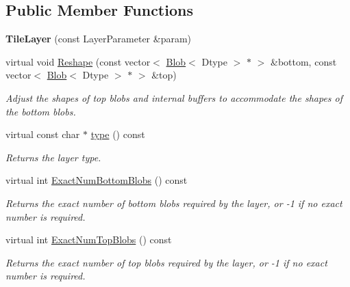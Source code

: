 \subsection*{Public Member Functions}
\begin{DoxyCompactItemize}
\item 
{\bfseries Tile\+Layer} (const Layer\+Parameter \&param)\hypertarget{classcaffe_1_1TileLayer_a7c6cb911e56abaf3dc43c38b8dc0e94e}{}\label{classcaffe_1_1TileLayer_a7c6cb911e56abaf3dc43c38b8dc0e94e}

\item 
virtual void \hyperlink{classcaffe_1_1TileLayer_acac859e9a1ed4a168bdece50543a6d2c}{Reshape} (const vector$<$ \hyperlink{classcaffe_1_1Blob}{Blob}$<$ Dtype $>$ $\ast$ $>$ \&bottom, const vector$<$ \hyperlink{classcaffe_1_1Blob}{Blob}$<$ Dtype $>$ $\ast$ $>$ \&top)
\begin{DoxyCompactList}\small\item\em Adjust the shapes of top blobs and internal buffers to accommodate the shapes of the bottom blobs. \end{DoxyCompactList}\item 
virtual const char $\ast$ \hyperlink{classcaffe_1_1TileLayer_a20aaa38201d0fe2d61fdd79b73c10d58}{type} () const \hypertarget{classcaffe_1_1TileLayer_a20aaa38201d0fe2d61fdd79b73c10d58}{}\label{classcaffe_1_1TileLayer_a20aaa38201d0fe2d61fdd79b73c10d58}

\begin{DoxyCompactList}\small\item\em Returns the layer type. \end{DoxyCompactList}\item 
virtual int \hyperlink{classcaffe_1_1TileLayer_a7135c09877493a4ac9533f3952af74ae}{Exact\+Num\+Bottom\+Blobs} () const 
\begin{DoxyCompactList}\small\item\em Returns the exact number of bottom blobs required by the layer, or -\/1 if no exact number is required. \end{DoxyCompactList}\item 
virtual int \hyperlink{classcaffe_1_1TileLayer_a4f442a78d1234169a1ef3d51f2eda9e4}{Exact\+Num\+Top\+Blobs} () const 
\begin{DoxyCompactList}\small\item\em Returns the exact number of top blobs required by the layer, or -\/1 if no exact number is required. \end{DoxyCompactList}\end{DoxyCompactItemize}
